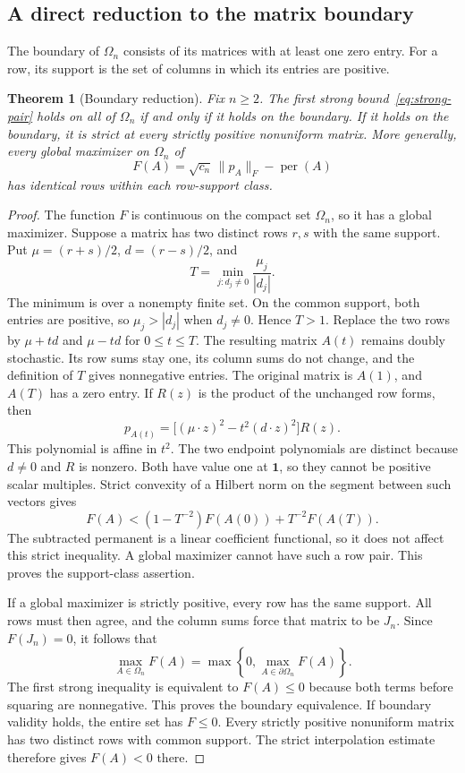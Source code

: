 \documentclass[11pt,a4paper]{article}
\newtheorem{theorem}{Theorem}[section]
\theoremstyle{definition}
\theoremstyle{remark}
\newcommand{\per}{\operatorname{per}}
\begin{document}
\subsection{A direct reduction to the matrix boundary}

The boundary of $\Omega_n$ consists of its matrices with at least one zero entry.
For a row, its support is the set of columns in which its entries are positive.

\begin{theorem}[Boundary reduction]\label{thm:struct-boundary}
Fix $n\ge2$.
The first strong bound~\eqref{eq:strong-pair} holds on all of $\Omega_n$ if and only if it holds on the boundary.
If it holds on the boundary, it is strict at every strictly positive nonuniform matrix.
More generally, every global maximizer on $\Omega_n$ of
\[
 F(A)=\sqrt{c_n}\,\|p_A\|_F-\per(A)
\]
has identical rows within each row-support class.
\end{theorem}

\begin{proof}
The function $F$ is continuous on the compact set $\Omega_n$, so it has a global maximizer.
Suppose a matrix has two distinct rows $r,s$ with the same support.
Put $\mu=(r+s)/2$, $d=(r-s)/2$, and
\[
 T=\min_{j:d_j\ne0}\frac{\mu_j}{|d_j|}.
\]
The minimum is over a nonempty finite set.
On the common support, both entries are positive, so $\mu_j>|d_j|$ when $d_j\ne0$.
Hence $T>1$.
Replace the two rows by $\mu+td$ and $\mu-td$ for $0\le t\le T$.
The resulting matrix $A(t)$ remains doubly stochastic.
Its row sums stay one, its column sums do not change, and the definition of $T$ gives nonnegative entries.
The original matrix is $A(1)$, and $A(T)$ has a zero entry.
If $R(z)$ is the product of the unchanged row forms, then
\[
 p_{A(t)}=\bigl[(\mu\cdot z)^2-t^2(d\cdot z)^2\bigr]R(z).
\]
This polynomial is affine in $t^2$.
The two endpoint polynomials are distinct because $d\ne0$ and $R$ is nonzero.
Both have value one at $\mathbf1$, so they cannot be positive scalar multiples.
Strict convexity of a Hilbert norm on the segment between such vectors gives
\[
 F(A)<(1-T^{-2})F(A(0))+T^{-2}F(A(T)).
\]
The subtracted permanent is a linear coefficient functional, so it does not affect this strict inequality.
A global maximizer cannot have such a row pair.
This proves the support-class assertion.

If a global maximizer is strictly positive, every row has the same support.
All rows must then agree, and the column sums force that matrix to be $J_n$.
Since $F(J_n)=0$, it follows that
\[
 \max_{A\in\Omega_n}F(A)
 =\max\left\{0,\max_{A\in\partial\Omega_n}F(A)\right\}.
\]
The first strong inequality is equivalent to $F(A)\le0$ because both terms before squaring are nonnegative.
This proves the boundary equivalence.
If boundary validity holds, the entire set has $F\le0$.
Every strictly positive nonuniform matrix has two distinct rows with common support.
The strict interpolation estimate therefore gives $F(A)<0$ there.
\end{proof}
\end{document}
